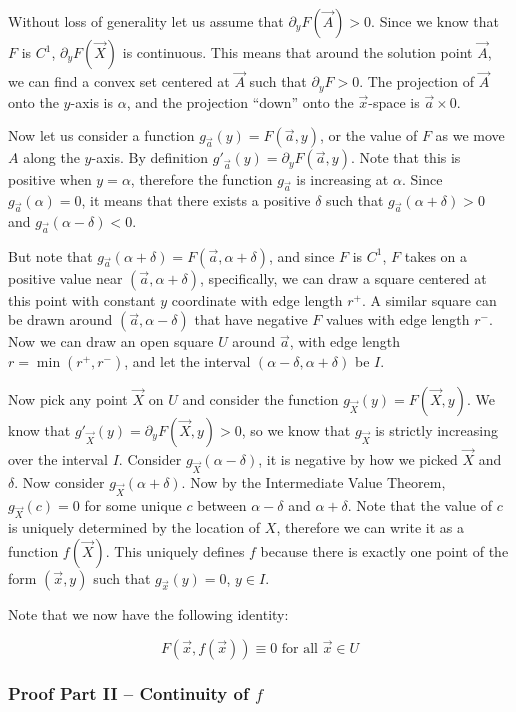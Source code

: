 \documentclass [12 pt, twoside] {book}
\newcommand\+{\text{ }}
\begin{document}
Without loss of generality let us assume that $\partial_y F(\vec{A}) > 0$. Since
we know that $F$ is $C^1$, $\partial_y F(\vec{X})$ is continuous. This means
that around the solution point $\vec{A}$, we can find a convex set centered at
$\vec{A}$ such that $\partial_y F > 0$. The projection of $\vec{A}$ onto the
$y$-axis is $\alpha$, and the projection ``down'' onto the $\vec{x}$-space is
$\vec{a} \times {0}$.

Now let us consider a function $g_{\vec{a}}(y) = F(\vec{a}, y)$, or the value of
$F$ as we move $A$ along the $y$-axis. By definition $g'_{\vec{a}}(y) =
\partial_y F(\vec{a}, y)$. Note that this is positive when $y = \alpha$,
therefore the function $g_{\vec{a}}$ is increasing at $\alpha$. Since
$g_{\vec{a}}(\alpha) = 0$, it means that there exists a positive $\delta$ such
that $g_{\vec{a}}(\alpha + \delta) > 0$ and $g_{\vec{a}}(\alpha - \delta) < 0$.

But note that $g_{\vec{a}}(\alpha + \delta) = F(\vec{a}, \alpha + \delta)$, and
since $F$ is $C^1$, $F$ takes on a positive value near $(\vec{a}, \alpha +
\delta)$, specifically, we can draw a square centered at this point with
constant $y$ coordinate with edge length $r^+$. A similar square can be drawn
around $(\vec{a}, \alpha - \delta)$ that have negative $F$ values with edge
length $r^-$. Now we can draw an open square $U$ around $\vec{a}$, with edge
length $r = \min(r^+, r^-)$, and let the interval $(\alpha - \delta, \alpha +
\delta)$ be $I$.

Now pick any point $\vec{X}$ on $U$ and consider the function $g_{\vec{X}} (y) =
F(\vec{X}, y)$. We know that $g'_{\vec{X}}(y) = \partial_y F(\vec{X}, y) > 0$,
so we know that $g_{\vec{X}}$ is strictly increasing over the interval $I$.
Consider $g_{\vec{X}} (\alpha - \delta)$, it is negative by how we picked
$\vec{X}$ and $\delta$. Now consider $g_{\vec{X}} (\alpha + \delta)$. Now by the
Intermediate Value Theorem, $g_{\vec{X}} (c) = 0$ for some unique $c$ between
$\alpha - \delta$ and $\alpha + \delta$. Note that the value of $c$ is uniquely
determined by the location of $X$, therefore we can write it as a function
$f(\vec{X})$. This uniquely defines $f$ because there is exactly one point of
the form $(\vec{x}, y)$ such that $g_{\vec{x}}(y) = 0$, $y \in I$.

Note that we now have the following identity:

$$\boxed{F(\vec{x}, f(\vec{x})) \equiv 0 \text{ for all } \vec{x} \in U}$$

\subsubsection{Proof Part II -- Continuity of $f$}
\end{document}

